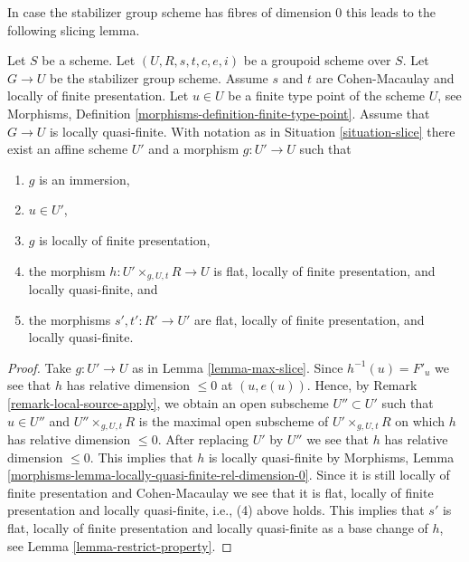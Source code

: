 \noindent
In case the stabilizer group scheme has fibres of dimension 0
this leads to the following slicing lemma.

\begin{lemma}
\label{lemma-max-slice-quasi-finite}
Let $S$ be a scheme.
Let $(U, R, s, t, c, e, i)$ be a groupoid scheme over $S$.
Let $G \to U$ be the stabilizer group scheme.
Assume $s$ and $t$ are Cohen-Macaulay and locally of finite presentation.
Let $u \in U$ be a finite type point of the scheme $U$, see
Morphisms, Definition \ref{morphisms-definition-finite-type-point}.
Assume that $G \to U$ is locally quasi-finite.
With notation as in
Situation \ref{situation-slice}
there exist an affine scheme $U'$ and a morphism $g : U' \to U$ such that
\begin{enumerate}
\item $g$ is an immersion,
\item $u \in U'$,
\item $g$ is locally of finite presentation,
\item the morphism $h : U' \times_{g, U, t} R \longrightarrow U$
is flat, locally of finite presentation, and locally quasi-finite, and
\item the morphisms $s', t' : R' \to U'$ are flat,
locally of finite presentation, and locally quasi-finite.
\end{enumerate}
\end{lemma}

\begin{proof}
Take $g : U' \to U$ as in
Lemma \ref{lemma-max-slice}.
Since $h^{-1}(u) = F'_u$ we see that $h$ has relative dimension
$\leq 0$ at $(u, e(u))$. Hence, by
Remark \ref{remark-local-source-apply},
we obtain an open subscheme $U'' \subset U'$ such that
$u \in U''$ and $U'' \times_{g, U, t} R$ is the maximal open subscheme
of $U' \times_{g, U, t} R$ on which $h$ has relative dimension $\leq 0$.
After replacing $U'$ by $U''$ we see that $h$ has relative dimension $\leq 0$.
This implies that $h$ is locally quasi-finite by
Morphisms, Lemma \ref{morphisms-lemma-locally-quasi-finite-rel-dimension-0}. 
Since it is still locally of finite presentation and Cohen-Macaulay we see
that it is flat, locally of finite presentation and locally quasi-finite,
i.e., (4) above holds. This implies that $s'$ is flat, locally of finite
presentation and locally quasi-finite as a base change of $h$, see
Lemma \ref{lemma-restrict-property}.
\end{proof}







